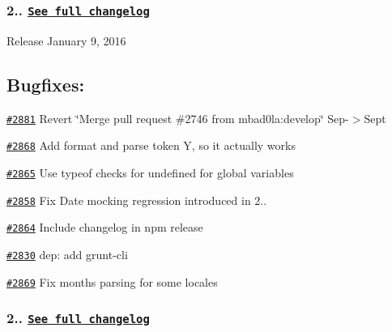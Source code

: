 \subsubsection*{2.. \href{https://gist.github.com/ichernev/8ec3ee25b749b4cff3c2}{\tt See full changelog}}


\begin{DoxyItemize}
\item Release January 9, 2016
\end{DoxyItemize}

\subsection*{Bugfixes\+:}


\begin{DoxyItemize}
\item \href{https://github.com/moment/moment/pull/2881}{\tt \#2881} Revert \char`\"{}\+Merge pull request \#2746 from mbad0la\+:develop\char`\"{} Sep-\/$>$Sept
\item \href{https://github.com/moment/moment/pull/2868}{\tt \#2868} Add format and parse token Y, so it actually works
\item \href{https://github.com/moment/moment/pull/2865}{\tt \#2865} Use typeof checks for undefined for global variables
\item \href{https://github.com/moment/moment/pull/2858}{\tt \#2858} Fix Date mocking regression introduced in 2..
\item \href{https://github.com/moment/moment/pull/2864}{\tt \#2864} Include changelog in npm release
\item \href{https://github.com/moment/moment/pull/2830}{\tt \#2830} dep\+: add grunt-\/cli
\item \href{https://github.com/moment/moment/pull/2869}{\tt \#2869} Fix months parsing for some locales
\end{DoxyItemize}

\subsubsection*{2.. \href{https://gist.github.com/ichernev/6594bc29719dde6b2f66}{\tt See full changelog}}


